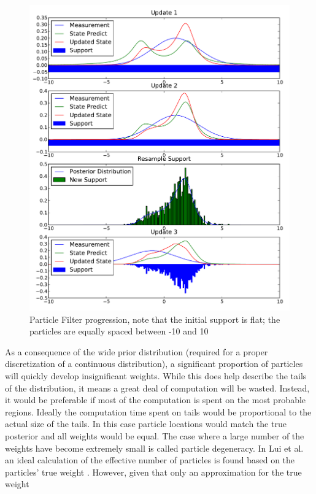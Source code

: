 \begin{figure}
\includegraphics[width=16cm]{images/particle_filter}
\caption{Particle Filter progression, note that the initial support is flat; the particles
are equally spaced between -10 and 10}
\end{figure}
As a consequence 
of the wide prior distribution (required for a proper discretization of a continuous
distribution), a significant proportion of particles will quickly
develop insignificant weights. 
While this does help
describe the tails of the distribution, it means a great deal of computation will be wasted.
Instead, it would be preferable if most of the computation is spent on the most probable regions.
Ideally the computation time spent on tails would be proportional to the actual size of the
tails. In this case particle locations would match the true posterior and all weights would
be equal.  The case where a large number of the weights have become extremely small
is called particle degeneracy. In  Lui et al. 
an ideal calculation of the effective number of particles is found based on the 
particles' true weight \cite{Liu1998b}. However, given that only an approximation 
for the true weight 
